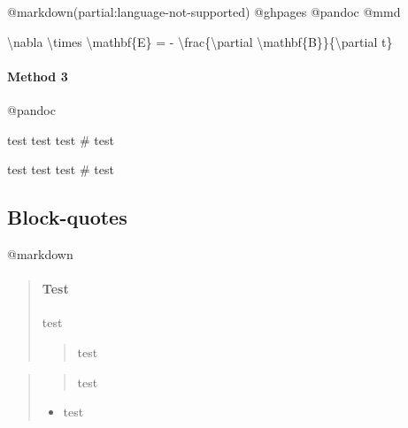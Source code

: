 \documentclass[]{article}
\newenvironment{Shaded}{}{}
\newcommand{\BaseNTok}[1]{\textcolor[rgb]{0.25,0.63,0.44}{{#1}}}
\newcommand{\NormalTok}[1]{{#1}}
\providecommand{\tightlist}{%
  \setlength{\itemsep}{0pt}\setlength{\parskip}{0pt}}
\let\oldparagraph\paragraph
\renewcommand{\paragraph}[1]{\oldparagraph{#1}\mbox{}}
\begin{document}
@markdown(partial:language-not-supported) @ghpages @pandoc @mmd

\begin{Shaded}
\begin{Highlighting}[]
\NormalTok{\textbackslash{}nabla \textbackslash{}times \textbackslash{}mathbf\{E\} = - \textbackslash{}frac\{\textbackslash{}partial \textbackslash{}mathbf\{B\}\}\{\textbackslash{}partial t\}}
\end{Highlighting}
\end{Shaded}

\paragraph{Method 3}\label{method-3}

@pandoc

\begin{Shaded}
\begin{Highlighting}[]
\NormalTok{test}
\NormalTok{test}
\BaseNTok{    test}
\BaseNTok{    # test}
\end{Highlighting}
\end{Shaded}

\hypertarget{mycode}{\label{mycode}}
\begin{Shaded}
\begin{Highlighting}[numbers=left,,firstnumber=100,]
\NormalTok{test}
\NormalTok{test}
\BaseNTok{    test}
\BaseNTok{    # test}
\end{Highlighting}
\end{Shaded}

\subsection{Block-quotes}\label{block-quotes}

@markdown

\begin{quote}
\mbox{}%
\paragraph{Test}\label{test}

test

\begin{quote}
test
\end{quote}
\end{quote}

\begin{quote}
\begin{quote}
test
\end{quote}

\begin{itemize}
\tightlist
\item
  test
\end{itemize}
\end{quote}
\end{document}
